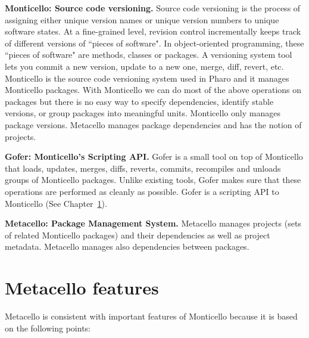 \documentclass[a4paper,10pt,twoside]{book}
\begin{document}
\begin{description}

\item{\textbf{Monticello: Source code versioning.}}
Source code versioning is the process of assigning either unique version names or unique version numbers to unique software states. At a fine-grained level, revision control incrementally keeps track of different versions of ``pieces of software". In object-oriented programming, these ``pieces of software" are methods, classes or packages. A versioning system tool lets you commit a new version, update to a new one, merge, diff, revert, etc. Monticello is the source code versioning system used in Pharo and it manages Monticello packages. With Monticello we can do most of the above operations on packages but there is no easy way to specify dependencies, identify stable versions, or group packages into meaningful units.  Monticello only manages package versions. Metacello manages package dependencies and has the notion of projects.

\item {\textbf{Gofer: Monticello's Scripting API.}}
Gofer is a small tool on top of Monticello that loads, updates, merges, diffs, reverts, commits, recompiles and unloads groups of Monticello packages. Unlike existing tools, Gofer makes sure that these operations are performed as cleanly as possible. Gofer is a scripting API to Monticello (See Chapter~\ref{}).


\item{\textbf{Metacello: Package Management System.}} Metacello manages projects (sets of related Monticello packages) and their dependencies as well as project metadata. Metacello manages also dependencies between packages.
\end{description}




\section{Metacello features}

Metacello is consistent with important features of Monticello because it is based on the following points:
\end{document}
